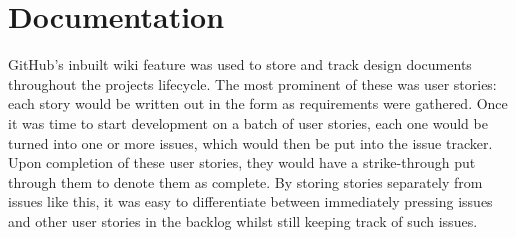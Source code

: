 \documentclass{l4proj}
\begin{document}
\section{Documentation}
GitHub's inbuilt wiki feature was used to store and track design documents throughout the projects lifecycle. The most prominent of these was user stories: each story would be written out in the form  as requirements were gathered. Once it was time to start development on a batch of user stories, each one would be turned into one or more issues, which would then be put into the issue tracker. Upon completion of these user stories, they would have a strike-through put through them to denote them as complete. By storing stories separately from issues like this, it was easy to differentiate between immediately pressing issues and other user stories in the backlog whilst still keeping track of such issues.
\end{document}
